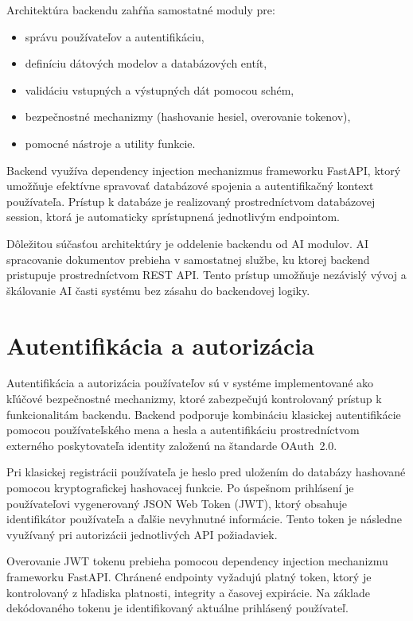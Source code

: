 \documentclass[12pt,a4paper]{article}
\begin{document}
Architektúra backendu zahŕňa samostatné moduly pre:
\begin{itemize}
    \item správu používateľov a autentifikáciu,
    \item definíciu dátových modelov a databázových entít,
    \item validáciu vstupných a výstupných dát pomocou schém,
    \item bezpečnostné mechanizmy (hashovanie hesiel, overovanie tokenov),
    \item pomocné nástroje a utility funkcie.
\end{itemize}

Backend využíva dependency injection mechanizmus frameworku FastAPI,
ktorý umožňuje efektívne spravovať databázové spojenia a autentifikačný
kontext používateľa. Prístup k databáze je realizovaný prostredníctvom
databázovej session, ktorá je automaticky sprístupnená jednotlivým endpointom.

Dôležitou súčasťou architektúry je oddelenie backendu od AI modulov.
AI spracovanie dokumentov prebieha v samostatnej službe, ku ktorej backend
pristupuje prostredníctvom REST API. Tento prístup umožňuje nezávislý vývoj
a škálovanie AI časti systému bez zásahu do backendovej logiky.

\section{Autentifikácia a autorizácia}

Autentifikácia a autorizácia používateľov sú v systéme implementované ako
kľúčové bezpečnostné mechanizmy, ktoré zabezpečujú kontrolovaný prístup
k funkcionalitám backendu. Backend podporuje kombináciu klasickej autentifikácie
pomocou používateľského mena a hesla a autentifikáciu prostredníctvom externého
poskytovateľa identity založenú na štandarde OAuth~2.0.

Pri klasickej registrácii používateľa je heslo pred uložením do databázy
hashované pomocou kryptografickej hashovacej funkcie. Po úspešnom prihlásení
je používateľovi vygenerovaný JSON Web Token (JWT), ktorý obsahuje identifikátor
používateľa a ďalšie nevyhnutné informácie. Tento token je následne využívaný
pri autorizácii jednotlivých API požiadaviek.

Overovanie JWT tokenu prebieha pomocou dependency injection
mechanizmu frameworku FastAPI. Chránené endpointy vyžadujú platný token,
ktorý je kontrolovaný z hľadiska platnosti, integrity a časovej expirácie.
Na základe dekódovaného tokenu je identifikovaný aktuálne prihlásený používateľ.
\end{document}

